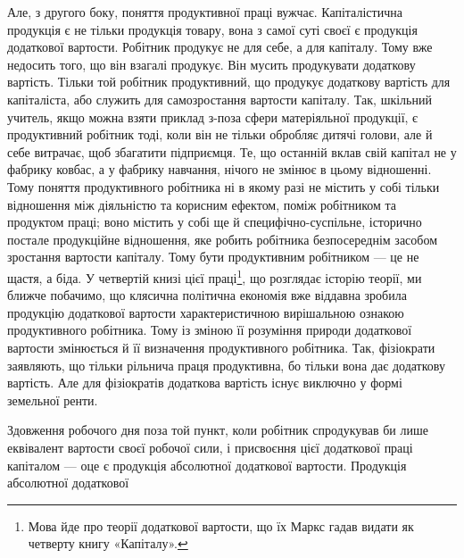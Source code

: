 Але, з другого боку, поняття продуктивної праці вужчає.
Капіталістична продукція є не тільки продукція товару, вона
з самої суті своєї є продукція додаткової вартости. Робітник
продукує не для себе, а для капіталу. Тому вже недосить того,
що він взагалі продукує. Він мусить продукувати додаткову
вартість. Тільки той робітник продуктивний, що продукує додаткову
вартість для капіталіста, або служить для самозростання
вартости капіталу. Так, шкільний учитель, якщо можна
взяти приклад з-поза сфери матеріяльної продукції, є продуктивний
робітник тоді, коли він не тільки обробляє дитячі голови,
але й себе витрачає, щоб збагатити підприємця. Те, що останній
вклав свій капітал не у фабрику ковбас, а у фабрику навчання,
нічого не змінює в цьому відношенні. Тому поняття продуктивного
робітника ні в якому разі не містить у собі тільки відношення
між діяльністю та корисним ефектом, поміж робітником та продуктом
праці; воно містить у собі ще й специфічно-суспільне,
історично постале продукційне відношення, яке робить робітника
безпосереднім засобом зростання вартости капіталу. Тому бути
продуктивним робітником — це не щастя, а біда. У четвертій
книзі цієї праці\footnote*{
Мова йде про теорії додаткової вартости, що їх Маркс гадав видати
як четверту книгу «Капіталу». 
}, що розглядає історію теорії, ми ближче побачимо,
що клясична політична економія вже віддавна зробила
продукцію додаткової вартости характеристичною вирішальною
ознакою продуктивного робітника. Тому із зміною її розуміння
природи додаткової вартости змінюється й її визначення продуктивного
робітника. Так, фізіократи заявляють, що тільки
рільнича праця продуктивна, бо тільки вона дає додаткову вартість.
Але для фізіократів додаткова вартість існує виключно
у формі земельної ренти.

Здовження робочого дня поза той пункт, коли робітник спродукував
би лише еквівалент вартости своєї робочої сили, і присвоєння
цієї додаткової праці капіталом — оце є продукція
абсолютної додаткової вартости. Продукція абсолютної додаткової
\parbreak{}  %
